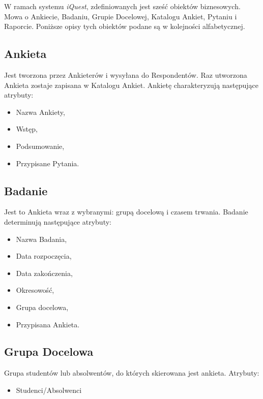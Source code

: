 W ramach systemu \textit{iQuest}, zdefiniowanych jest sześć obiektów biznesowych. Mowa o Ankiecie, Badaniu, Grupie Docelowej, Katalogu Ankiet, Pytaniu i Raporcie. Poniższe opisy tych obiektów podane są w kolejności alfabetycznej.

\subsection{Ankieta}
\label{Chapter231}

Jest tworzona przez Ankieterów i wysyłana do Respondentów. Raz utworzona Ankieta zostaje zapisana w Katalogu Ankiet. Ankietę charakteryzują następujące atrybuty:

\begin{itemize}
\item Nazwa Ankiety,
\item Wstęp,
\item Podsumowanie,
\item Przypisane Pytania.
\end{itemize}

\subsection{Badanie}
\label{Chapter232}

Jest to Ankieta wraz z wybranymi: grupą docelową i czasem trwania. Badanie determinują następujące atrybuty:

\begin{itemize}
\item Nazwa Badania,
\item Data rozpoczęcia,
\item Data zakończenia,
\item Okresowość,
\item Grupa docelowa,
\item Przypisana Ankieta.
\end{itemize}

\subsection{Grupa Docelowa}
\label{Chapter233}

Grupa studentów lub absolwentów, do których skierowana jest ankieta. Atrybuty:

\begin{itemize}
\item Studenci\slash Absolwenci
\end{itemize}

